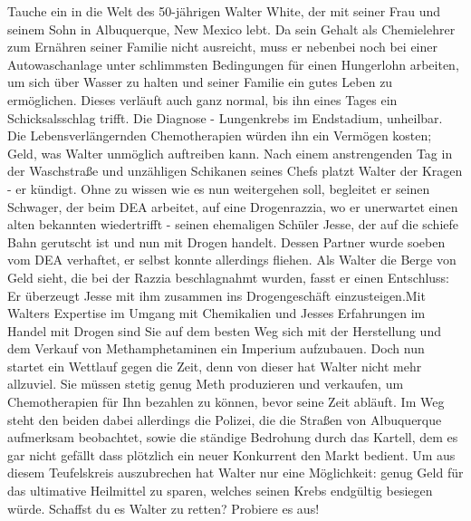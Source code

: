 
Tauche ein in die Welt des 50-jährigen Walter White, der mit seiner Frau und seinem Sohn in Albuquerque, New Mexico lebt. Da sein Gehalt als Chemielehrer zum Ernähren seiner Familie nicht ausreicht, muss er nebenbei noch bei einer Autowaschanlage unter schlimmsten Bedingungen für einen Hungerlohn arbeiten, um sich über Wasser zu halten und seiner Familie ein gutes Leben zu ermöglichen. Dieses verläuft auch ganz normal, bis ihn eines Tages ein Schicksalsschlag trifft. Die Diagnose - Lungenkrebs im Endstadium, unheilbar. \newline Die Lebensverlängernden Chemotherapien würden ihn ein Vermögen kosten; Geld, was Walter unmöglich auftreiben kann. Nach einem anstrengenden Tag in der Waschstraße und unzähligen Schikanen seines Chefs platzt Walter der Kragen - er kündigt. Ohne zu wissen wie es nun weitergehen soll, begleitet er seinen Schwager, der beim DEA arbeitet, auf eine Drogenrazzia, wo er unerwartet einen alten bekannten wiedertrifft - seinen ehemaligen Schüler Jesse, der auf die schiefe Bahn gerutscht ist und nun mit Drogen handelt. Dessen Partner wurde soeben vom DEA verhaftet, er selbst konnte allerdings fliehen. Als Walter die Berge von Geld sieht, die bei der Razzia beschlagnahmt wurden, fasst er einen Entschluss: Er überzeugt Jesse mit ihm zusammen ins Drogengeschäft einzusteigen.\newline Mit Walters Expertise im Umgang mit Chemikalien und Jesses Erfahrungen im Handel mit Drogen sind Sie auf dem besten Weg sich mit der Herstellung und dem Verkauf von Methamphetaminen ein Imperium aufzubauen. Doch nun startet ein Wettlauf gegen die Zeit, denn von dieser hat Walter nicht mehr allzuviel. \newline Sie müssen stetig genug Meth produzieren und verkaufen, um Chemotherapien für Ihn bezahlen zu können, bevor seine Zeit abläuft. Im Weg steht den beiden dabei allerdings die Polizei, die die Straßen von Albuquerque aufmerksam beobachtet, sowie die ständige Bedrohung durch das Kartell, dem es gar nicht gefällt dass plötzlich ein neuer Konkurrent den Markt bedient. Um aus diesem Teufelskreis auszubrechen hat Walter nur eine Möglichkeit: genug Geld für das ultimative Heilmittel zu sparen, welches seinen Krebs endgültig besiegen würde. Schaffst du es Walter zu retten? Probiere es aus!